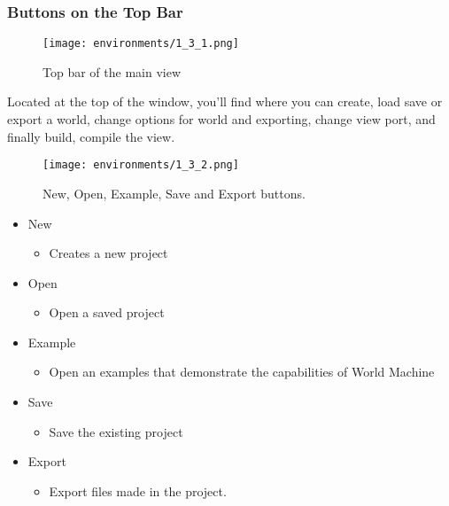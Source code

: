 \documentclass[../main.tex]{subfiles}
\begin{document}
\subsubsection{Buttons on the Top Bar}
\begin{figure}[H]
\texttt{[image: environments/1\_3\_1.png]}
\caption{Top bar of the main view}
\end{figure}
Located at the top of the window, you’ll find where you can create, load save or export a world, change options for world and exporting, change view port, and finally build, compile the view.
\begin{figure}[H]
\texttt{[image: environments/1\_3\_2.png]}
\caption{New, Open, Example, Save and Export buttons.}
\end{figure}
\begin{itemize}
    \item New
        \begin{itemize}
            \item Creates a new project
        \end{itemize}
    \item Open
        \begin{itemize}
            \item Open a saved project
        \end{itemize}
    \item Example
        \begin{itemize}
            \item Open an examples that demonstrate the capabilities of World Machine
        \end{itemize}
    \item Save
        \begin{itemize}
            \item Save the existing project
        \end{itemize}
    \item Export
        \begin{itemize}
            \item Export files made in the project.
        \end{itemize}
\end{itemize}
\end{document}
